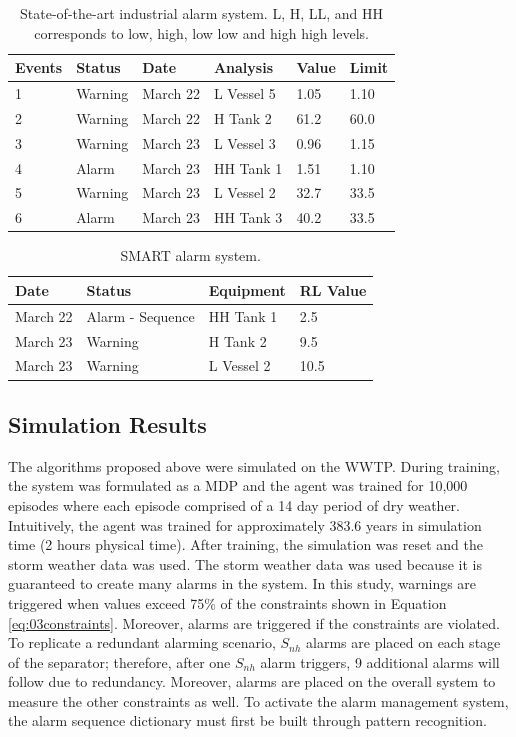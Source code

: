 \begin{table}[H]
	\centering
	\begin{tabular}{P{1.1cm}|P{2.1cm}|P{2.1cm}|P{2.5cm}|P{2cm}|P{2cm}}
	Events & Status & Date & Analysis & Value & Limit \\  & Warning & March 22 & L Vessel 5 & 1.05 & 1.10 \\
	2 & Warning & March 22 & H Tank 2 & 61.2 & 60.0 \\
	3 & Warning & March 23 & L Vessel 3 & 0.96 & 1.15 \\
	4 & Alarm & March 23 & HH Tank 1 & 1.51 & 1.10 \\
	5 & Warning & March 23 & L Vessel 2 & 32.7 & 33.5 \\ 
	6 & Alarm & March 23 & HH Tank 3 & 40.2 & 33.5 \\
	\end{tabular}
	\caption{State-of-the-art industrial alarm system. L, H, LL, and HH corresponds to low, high, low low and high high levels.}
	\label{alg:03norm_system}
\end{table}

\begin{table}[H]
	\centering
	\begin{tabular}{P{2.5cm}|P{4.5cm}|P{2.5cm}|P{3cm}}
	Date & Status & Equipment &  RL Value\\ \hline
	March 22 & Alarm - Sequence & HH Tank 1 & 2.5\\
	March 23 & Warning & H Tank 2 &  9.5  \\
	March 23 & Warning & L Vessel 2 &  10.5 \\
	\end{tabular}
	\caption{SMART alarm system.}
	\label{alg:03SMARTalarm}
\end{table}

\subsection{Simulation Results}

The algorithms proposed above were simulated on the WWTP.  During training, the system was formulated as a MDP and the agent was trained for 10,000 episodes where each episode comprised of a 14 day period of dry weather.  Intuitively, the agent was trained for approximately 383.6 years in simulation time (2 hours physical time).  After training, the simulation was reset and the storm weather data was used.  The storm weather data was used because it is guaranteed to create many alarms in the system. In this study, warnings are triggered when values exceed 75\% of the constraints shown in Equation \ref{eq:03constraints}.  Moreover, alarms are triggered if the constraints are violated. To replicate a redundant alarming scenario, $S_{nh}$ alarms are placed on each stage of the separator; therefore, after one $S_{nh}$ alarm triggers, 9 additional alarms will follow due to redundancy.  Moreover, alarms are placed on the overall system to measure the other constraints as well.  To activate the alarm management system, the alarm sequence dictionary must first be built through pattern recognition.

